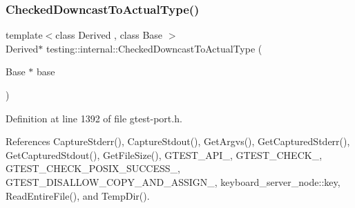 \subsubsection{\texorpdfstring{Checked\+Downcast\+To\+Actual\+Type()}{CheckedDowncastToActualType()}}
{\footnotesize\ttfamily template$<$class Derived , class Base $>$ \\
Derived$\ast$ testing\+::internal\+::\+Checked\+Downcast\+To\+Actual\+Type (\begin{DoxyParamCaption}\item[{Base $\ast$}]{base }\end{DoxyParamCaption})}



Definition at line 1392 of file gtest-\/port.\+h.



References Capture\+Stderr(), Capture\+Stdout(), Get\+Argvs(), Get\+Captured\+Stderr(), Get\+Captured\+Stdout(), Get\+File\+Size(), G\+T\+E\+S\+T\+\_\+\+A\+P\+I\+\_\+, G\+T\+E\+S\+T\+\_\+\+C\+H\+E\+C\+K\+\_\+, G\+T\+E\+S\+T\+\_\+\+C\+H\+E\+C\+K\+\_\+\+P\+O\+S\+I\+X\+\_\+\+S\+U\+C\+C\+E\+S\+S\+\_\+, G\+T\+E\+S\+T\+\_\+\+D\+I\+S\+A\+L\+L\+O\+W\+\_\+\+C\+O\+P\+Y\+\_\+\+A\+N\+D\+\_\+\+A\+S\+S\+I\+G\+N\+\_\+, keyboard\+\_\+server\+\_\+node\+::key, Read\+Entire\+File(), and Temp\+Dir().



